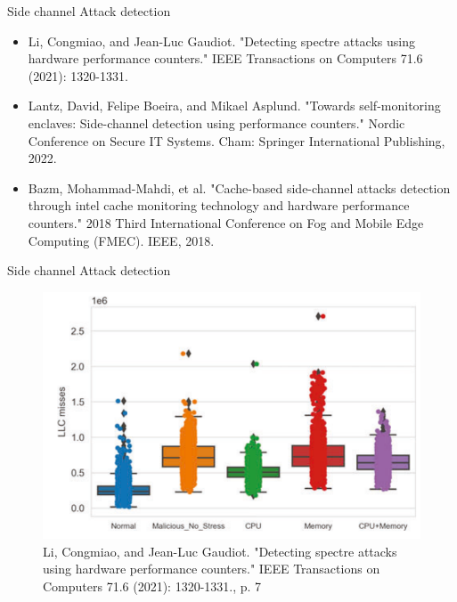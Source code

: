 \documentclass[aspectratio=169]{beamer}
\begin{document}
\begin{frame}{Side channel Attack detection}
    \begin{itemize}
        \item Li, Congmiao, and Jean-Luc Gaudiot. "Detecting spectre attacks using hardware performance counters." {\footnotesize{IEEE Transactions on Computers 71.6 (2021): 1320-1331.}}
        \item Lantz, David, Felipe Boeira, and Mikael Asplund. "Towards self-monitoring enclaves: Side-channel detection using performance counters." {\footnotesize{Nordic Conference on Secure IT Systems. Cham: Springer International Publishing, 2022.}}
        \item Bazm, Mohammad-Mahdi, et al. "Cache-based side-channel attacks detection through intel cache monitoring technology and hardware performance counters." {\footnotesize{2018 Third International Conference on Fog and Mobile Edge Computing (FMEC). IEEE, 2018.}}
    \end{itemize}
\end{frame}
\begin{frame}{Side channel Attack detection}
    \begin{center}
        \begin{figure}
            \includegraphics[width=.6\textwidth]{images/spectre_llc_miss_distribution.png}
            \caption{{\footnotesize{Li, Congmiao, and Jean-Luc Gaudiot. "Detecting spectre attacks using hardware performance counters." IEEE Transactions on Computers 71.6 (2021): 1320-1331., p. 7}}}
        \end{figure}
    \end{center}
\end{frame}
\end{document}
